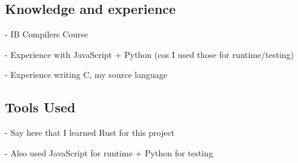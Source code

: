 \documentclass[00-main.tex]{subfiles}
\begin{document}
\subsection{Knowledge and experience}

\begin{Comment}
- IB Compilers Course

- Experience with JavaScript + Python (cos I used those for runtime/testing)

- Experience writing C, my source language
\end{Comment}

\subsection{Tools Used}

\begin{Comment}
- Say here that I learned Rust for this project

- Also used JavaScript for runtime + Python for testing
\end{Comment}
\end{document}
